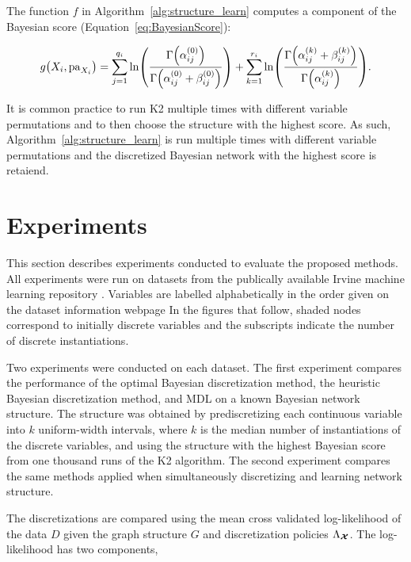 The function $f$ in Algorithm~\ref{alg:structure_learn} computes a component of the Bayesian score (Equation~\ref{eq:BayesianScore}):

\begin{equation}
  \label{eq:B_Score_one}
  g\paren{X_i, \Pa_{X_i}} =  \sum_{j=1}^{q_i} \ln\paren{
    \frac{
      \Gamma\paren{\alpha_{ij}^{(0)}}
    }{
      \Gamma\paren{\alpha_{ij}^{(0)} + \beta_{ij}^{(0)}}
    }
  } + \sum_{k=1}^{r_i} \ln \paren{
    \frac{
      \Gamma\paren{\alpha_{ij}^{(k)} + \beta_{ij}^{(k)}}
    }{
      \Gamma\paren{\alpha_{ij}^{(k)}}
    }
  }\text{.}
\end{equation}

It is common practice to run K2 multiple times with different variable permutations and to then choose the structure with the highest score.
As such, Algorithm~\ref{alg:structure_learn} is run multiple times with different variable permutations and the discretized Bayesian network with the highest score is retaiend.


\section{Experiments}
\label{sec:experiments}

This section describes experiments conducted to evaluate the proposed methods.
All experiments were run on datasets from the publically available Irvine machine learning repository \citep{Lichman_2013}.
Variables are labelled alphabetically in the order given on the dataset information webpage
In the figures that follow, shaded nodes correspond to initially discrete variables and the subscripts indicate the number of discrete instantiations.

Two experiments were conducted on each dataset.
The first experiment compares the performance of the optimal Bayesian discretization method, the heuristic Bayesian discretization method, and MDL on a known Bayesian network structure.
The structure was obtained by prediscretizing each continuous variable into $k$ uniform-width intervals, where $k$ is the median number of instantiations of the discrete variables, and using the structure with the highest Bayesian score from one thousand runs of the K2 algorithm.
The second experiment compares the same methods applied when simultaneously discretizing and learning network structure.

The discretizations are compared using the mean cross validated log-likelihood of the data $D$ given the graph structure $G$ and discretization policies $\Lambda_{\bm{\mathcal{X}}}$.
The log-likelihood has two components,

